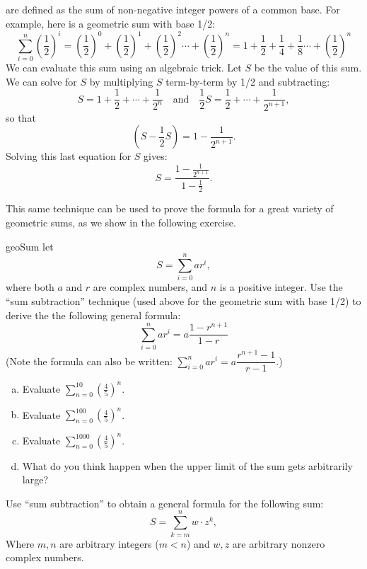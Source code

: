  are defined as the sum of non-negative integer powers of a common base.  For example, here is a geometric sum with base 1/2:
\[
\sum_{i=0}^{n}\left({\dfrac{1}{2}}\right)^i=\left({\dfrac{1}{2}}\right)^0+\left({\dfrac{1}{2}}\right)^1+\left({\dfrac{1}{2}}\right)^2\cdots +\left({\dfrac{1}{2}}\right)^n  = 1 + {\dfrac{1}{2}} + {\dfrac{1}{4}} + {\dfrac{1}{8}}\cdots +\left({\dfrac{1}{2}}\right)^n
\]
We can evaluate this sum using an algebraic trick.  Let $S$ be the value of this sum.  We can solve for $S$  by multiplying $S$ term-by-term by 1/2 and subtracting:
\[ S=1+\frac{1}{2}+ \cdots + \frac{1}{2^n} \quad \text{and} \quad
\frac{1}{2}S=\frac{1}{2}+ \cdots + \frac{1}{2^{n+1}},
\]
so that
\[
\left(S - \frac{1}{2}S\right) = 1 - \frac{1}{2^{n+1}}.
\]
Solving this last equation for $S$ gives:
\[S=\dfrac{1 - \frac{1}{2^{n+1}}}{1-\frac{1}{2}}. \]

This same technique can be used to prove the formula for a great variety of geometric sums, as we show in the following exercise.

\begin{exercise}{geoSum}
let 
\[
S = \sum_{i=0}^{n} ar^i,
\]
where both $a$ and $r$ are complex numbers, and $n$ is a positive integer.
Use the ``sum subtraction'' technique (used above for the geometric sum with base 1/2) to derive the the following general formula:
\[ \sum_{i=0}^{n} ar^i = a \dfrac{1-r^{n+1}}{1-r} \]
(Note the formula can also be written:  $ \sum_{i=0}^{n} ar^i = a \dfrac{r^{n+1}-1}{r-1} $.)
\end{exercise}

\begin{exercise}{}
\begin{enumerate}[(a)]
\item
Evaluate $\sum_{n=0}^{10} \left(\frac{4}{5}\right)^n$.
\item
Evaluate $\sum_{n=0}^{100} \left(\frac{4}{5}\right)^n$.
\item
Evaluate $\sum_{n=0}^{1000} \left(\frac{4}{5}\right)^n$.
\item
What do you think happen when the upper limit of the sum gets arbitrarily large?
\end{enumerate}
\end{exercise}

\begin{exercise}{}
Use ``sum subtraction'' to obtain a general formula for the following sum:
\[
S = \sum_{k=m}^{n} w\cdot z^k,
\]
Where $m,n$ are arbitrary integers ($m<n$) and $w,z$ are arbitrary nonzero complex numbers.
\end{exercise} 

